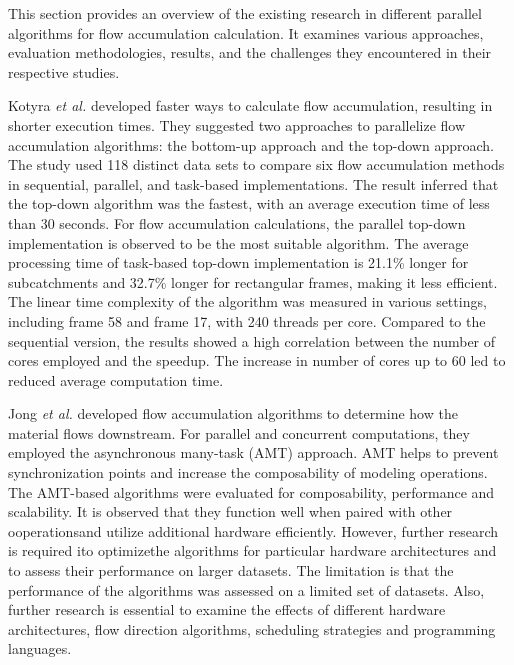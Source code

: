 \documentclass[journal, a4paper]{IEEEtran}
\begin{document}
	This section provides an overview of the existing research \cite{ KOTYRA2021104741, DEJONG2022105083, CHO2020104774, stojanovic2020accelerating, 10.1007/978-3-030-60939-9_16,KOTYRA2023105613, HUANG2022106} in different parallel algorithms for flow accumulation calculation. It examines various approaches, evaluation methodologies, results, and the challenges they encountered in their respective studies.
	
	Kotyra \textit{et al.} \cite{KOTYRA2021104741} developed faster ways to calculate flow accumulation, resulting in shorter execution times. They suggested two approaches to parallelize flow accumulation algorithms: the bottom-up approach and the top-down approach. The study used 118 distinct data sets to compare six flow accumulation methods in sequential, parallel, and task-based implementations. The result inferred that the top-down algorithm was the fastest, with an average execution time of less than 30 seconds. For flow accumulation calculations, the parallel top-down implementation is observed to be the most suitable algorithm. The average processing time of task-based top-down implementation is 21.1\% longer for subcatchments and 32.7\% longer for rectangular frames, making it less efficient. The linear time complexity of the algorithm was measured in various settings, including frame 58 and frame 17, with 240 threads per core. Compared to the sequential version, the results showed a high correlation between the number of cores employed and the speedup. The increase in number of cores up to 60 led to reduced average computation time.
	
	Jong \textit{et al.} \cite{DEJONG2022105083} developed flow accumulation algorithms to determine how the material flows downstream. For parallel and concurrent computations, they employed the asynchronous many-task (AMT) approach. AMT helps to prevent synchronization points and increase the composability of modeling operations. The AMT-based algorithms were evaluated for composability, performance and scalability. It is observed that they function well when paired with other ooperationsand utilize additional hardware efficiently. However, further research is required ito optimizethe algorithms for particular hardware architectures and to assess their performance on larger datasets. The limitation is that the performance of the algorithms was assessed on a limited set of datasets. Also, further research is essential to examine the effects of different hardware architectures, flow direction algorithms, scheduling strategies and programming languages.
	
\end{document}
